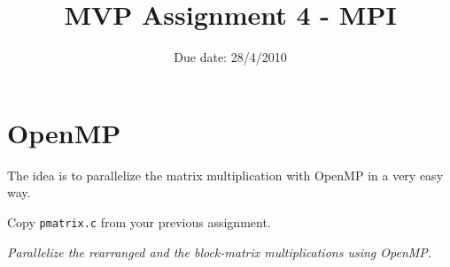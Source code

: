 \documentclass{article}
\title{MVP Assignment 4 - MPI}
\date{Due date: 28/4/2010}
\begin{document}
\maketitle

 \newcommand{\question}[1]{#1}
 \newcommand{\answer}[1]{}


%
%
\answer{
\begin{flushleft}
{\bf Group room:} FIXME\\
{\bf Group number:} FIXME
\end{flushleft}
}

\section{OpenMP}

The idea is to parallelize the matrix
multiplication with OpenMP in a very easy way.

\begin{ExerciseList}
\Exercise Copy \texttt{pmatrix.c} from your previous assignment.

\Question \emph{Parallelize the rearranged and the block-matrix
  multiplications using OpenMP.}

\end{ExerciseList}
\end{document}
